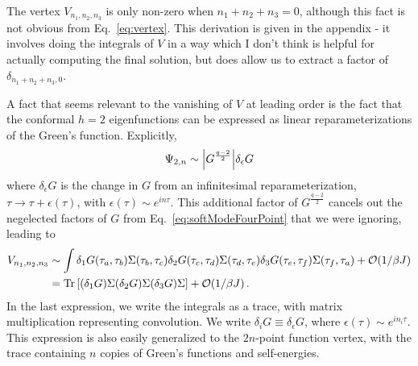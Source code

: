 \documentclass[aps,prx,preprint,onecolumn,citeautoscript,footinbib]{revtex4-1}
\newcommand{\Tr}{\operatorname{Tr}}
\begin{document}
The vertex $V_{n_1, n_2, n_3}$ is only non-zero when $n_1 + n_2 + n_3 = 0$, although this fact is not obvious from Eq.~\ref{eq:vertex}. This derivation is given in the appendix - it involves doing the integrals of $V$ in a way which I don't think is helpful for actually computing the final solution, but does allow us to extract a factor of $\delta_{n_1 + n_2 + n_3, 0}$.

A fact that seems relevant to the vanishing of $V$ at leading order is the fact that the conformal $h=2$ eigenfunctions can be expressed as linear reparameterizations of the Green's function. Explicitly,
\begin{equation}
    \Psi_{2, n} \sim \abs{G^{\frac{q-2}{2}}} \delta_{\epsilon} G 
\end{equation}
where $\delta_\epsilon G$ is the change in $G$ from an infinitesimal reparameterization, $\tau \rightarrow \tau + \epsilon(\tau)$, with $\epsilon(\tau) \sim e^{in\tau}$. This additional factor of $G^{\frac{q-2}{2}}$ cancels out the negelected factors of $G$ from Eq.~\ref{eq:softModeFourPoint} that we were ignoring, leading to 
\begin{equation}
\begin{aligned}
    V_{n_1, n_2, n_3} &\sim \int \delta_1 G(\tau_a, \tau_b) \Sigma(\tau_b, \tau_c) \delta_2 G(\tau_c, \tau_d) \Sigma(\tau_d, \tau_e) \delta_3 G(\tau_e, \tau_f)\Sigma(\tau_f, \tau_a) + \order{1/\beta J}
    \\
    &= \Tr \left[ (\delta_1 G) \Sigma (\delta_2 G) \Sigma (\delta_3 G) \Sigma \right] + \order{1/\beta J}\,.
    \label{eq:vertexSimplified}
    \end{aligned}
\end{equation}
In the last expression, we write the integrals as a trace, with matrix multiplication representing convolution. We write $\delta_i G \equiv \delta_\epsilon G$, where $\epsilon(\tau) \sim e^{i n_i \tau}$. This expression is also easily generalized to the $2n$-point function vertex, with the trace containing $n$ copies of Green's functions and self-energies.
\end{document}
